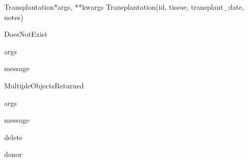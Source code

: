 \documentclass[letterpaper,10pt,english]{sphinxmanual}
\begin{document}
\hypertarget{data.models.Transplantation}{}\begin{classdesc}{Transplantation}{*args, **kwargs}
Transplantation(id, tissue, transplant\_date, notes)

\hypertarget{data.models.Transplantation.DoesNotExist}{}\begin{excdesc}{DoesNotExist}~

\hypertarget{data.models.Transplantation.DoesNotExist.args}{}\begin{memberdesc}{args}\end{memberdesc}

\hypertarget{data.models.Transplantation.DoesNotExist.message}{}\begin{memberdesc}{message}\end{memberdesc}
\end{excdesc}

\hypertarget{data.models.Transplantation.MultipleObjectsReturned}{}\begin{excdesc}{MultipleObjectsReturned}~

\hypertarget{data.models.Transplantation.MultipleObjectsReturned.args}{}\begin{memberdesc}{args}\end{memberdesc}

\hypertarget{data.models.Transplantation.MultipleObjectsReturned.message}{}\begin{memberdesc}{message}\end{memberdesc}
\end{excdesc}

\hypertarget{data.models.Transplantation.delete}{}\begin{methoddesc}[Transplantation]{delete}{}\end{methoddesc}

\hypertarget{data.models.Transplantation.donor}{}\begin{memberdesc}[Transplantation]{donor}\end{memberdesc}


\end{classdesc}
\end{document}
